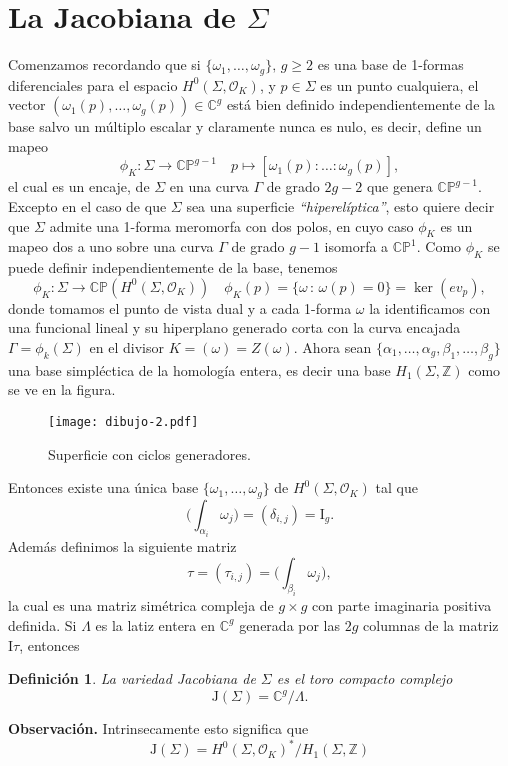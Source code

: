 \documentclass[letterpaper]{article}
\newtheorem{def.}{Definici\'on}[section]
\newcommand{\zah}{\ensuremath{ \mathbb Z }}
\newcommand{\obs}{{\noindent \sc \textbf{Observación. }}}
\newcommand{\ga}{\ensuremath{\Gamma}}
\newcommand{\sig}{\ensuremath{\Sigma}}
\newcommand{\co}{\ensuremath{\mathbb C }}
\newcommand{\cp}{\ensuremath{\mathbb{CP}}}
\newcommand{\lnb}{\ensuremath{\mathcal{O}}}
\begin{document}
\section{La Jacobiana de \(\sig\)}
\noindent Comenzamos recordando que si \(\{\omega_{1},\dots,\omega_{g}\},\,g\geq2\) es una base de 1-formas diferenciales para el espacio \(H^{0}(\sig,\lnb_{K})\), y \(p\in\sig\) es un punto cualquiera, el vector \((\omega_{1}(p),\dots,\omega_{g}(p))\in\co^{g}\) está bien definido independientemente de la base salvo un múltiplo escalar y claramente nunca es nulo, es decir, define un mapeo
\[
  \phi_{K}:\sig\rightarrow\cp^{g-1}\quad p\mapsto[\omega_{1}(p):\dots:\omega_{g}(p)],
\]
\noindent el cual es un encaje, de \(\sig\) en una curva \(\ga\) de grado \(2g-2\) que genera \(\cp^{g-1}\). Excepto en el caso de que \(\sig\) sea una superficie \emph{``hiperelíptica''}, esto quiere decir que \(\sig\) admite una  1-forma meromorfa con dos polos, en cuyo caso \(\phi_{K}\) es un mapeo dos a uno sobre una curva \(\ga\) de grado \(g-1\) isomorfa a \(\cp^{1}\).
Como \(\phi_{K}\) se puede definir independientemente de la base, tenemos
\[
  \phi_{K}:\sig\rightarrow\cp(H^{0}(\sig,\lnb_{K}))\quad\phi_{K}(p)=\{\omega\,:\,\omega(p)=0\}=\ker(ev_{p}),
\]
\noindent donde tomamos el punto de vista dual y a cada 1-forma \(\omega\) la identificamos con una funcional lineal y su hiperplano generado corta con la curva encajada \(\ga=\phi_{k}(\sig)\) en el divisor \(K=(\omega)=Z(\omega)\).
Ahora sean \(\{\alpha_{1},\dots,\alpha_{g},\beta_{1},\dots,\beta_{g}\}\) una base simpléctica de la homología entera, es decir una base \(H_{1}(\sig,\zah)\) como se ve en la figura.
\begin{figure}[htb]
\begin{center}
\texttt{[image: dibujo-2.pdf]}
  \caption{Superficie con ciclos generadores.}
  \label{fig:base-simp}
\end{center}
\end{figure}

Entonces existe una única base \(\{\omega_{1},\dots,\omega_{g}\}\) de \(H^{0}(\sig,\lnb_{K})\) tal que
\[
  \Big(\int_{\alpha_{i}}\omega_{j}\Big)=(\delta_{i,j})=\mathrm{I}_{g}.
\]
Además definimos la siguiente matriz
\[
  \tau=(\tau_{i,j})=\Big(\int_{\beta_{i}}\omega_{j}\Big),
\]
la cual es una matriz simétrica compleja de \(g\times g\) con parte imaginaria positiva definida. Si \(\Lambda\) es la latiz entera en \(\co^{g}\) generada por las \(2g\) columnas de la matriz \(\mathrm{I}\tau\), entonces
\begin{def.}
  La variedad Jacobiana de \(\sig\) es el toro compacto complejo
  \[
    \mathrm{J}(\sig)=\co^{g}/\Lambda.
  \]
\end{def.}
\obs Intrinsecamente esto significa que
\[
  \mathrm{J}(\sig)=H^{0}(\sig,\lnb_{K})^{*}/H_{1}(\sig,\zah)
\]
\end{document}
